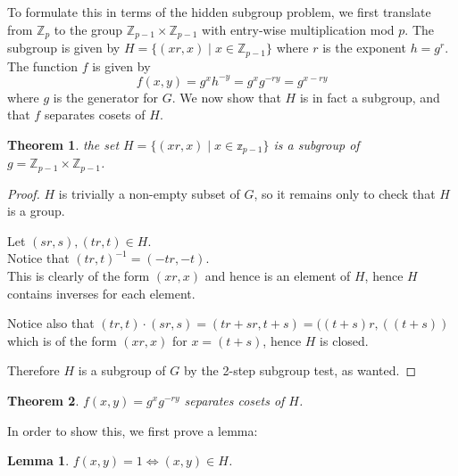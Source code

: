 \documentclass{article}
\theoremstyle{plain}
\newtheorem{theorem}{Theorem}
\newtheorem{lemma}{Lemma}[section]
\theoremstyle{centered}
\newcommand{\bb}[1]{\mathbb{#1}}
\begin{document}
        To formulate this in terms of the hidden subgroup problem, we first translate from $\bb{Z}_p$ to the group $\bb{Z}_{p-1} \times \bb{Z}_{p-1}$ with entry-wise multiplication mod $p$.
        The subgroup is given by $H = \{(xr, x) \mid x \in \bb{Z}_{p-1}\}$ where $r$ is the exponent $h = g^r$.
        The function $f$ is given by 
            $$f(x, y) = g^x h^{-y} = g^x g^{-ry} = g^{x - ry}$$ 
        where $g$ is the generator for $G$.
        We now show that $H$ is in fact a subgroup, and that $f$ separates cosets of $H$.
        \begin{theorem}
            the set $H = \{(xr, x) \mid x \in \bb{z}_{p - 1}\}$ is a subgroup of $g = \bb{Z}_{p-1} \times \bb{Z}_{p-1}$.
        \end{theorem}
        \begin{proof}
            $H$ is trivially a non-empty subset of $G$, so it remains only to check that $H$ is a group.

            Let $(sr, s), (tr, t) \in H$.\\
            Notice that $(tr, t)^{-1} = (-tr, -t)$.\\
            This is clearly of the form $(xr, x)$ and hence is an element of $H$, hence $H$ contains inverses for each element.

            Notice also that $(tr, t) \cdot (sr, s) = (tr + sr, t + s) = ((t + s)r, ((t + s))$ which is of the form $(xr, x)$ for $x = (t + s)$, hence $H$ is closed.

            Therefore $H$ is a subgroup of $G$ by the 2-step subgroup test, as wanted.
        \end{proof}
        \begin{theorem}\label{thm:DLP_separating_function}
            $f(x, y) = g^x g^{-ry}$ separates cosets of $H$.
        \end{theorem}
        In order to show this, we first prove a lemma:
        \begin{lemma}\label{lemma:DLP_lemma}
                $f(x, y) = 1 \iff (x, y) \in H$.
        \end{lemma}
\end{document}
